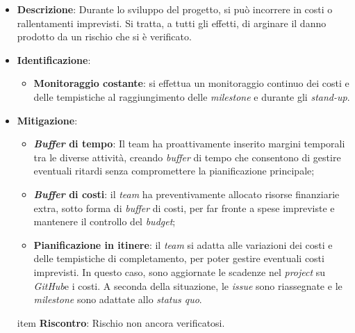 \label{risk:costi e tempi imprevisti}
\begin{itemize}
	\item \textbf{Descrizione}:
	      Durante lo sviluppo del progetto, si può incorrere in costi o
	      rallentamenti imprevisti. Si tratta, a tutti gli effetti, di arginare
	      il danno prodotto da un rischio che si è verificato.
	\item \textbf{Identificazione}:
	      \begin{itemize}
		      \item \textbf{Monitoraggio costante}: si effettua un monitoraggio 
			  		continuo dei costi e delle tempistiche al raggiungimento delle 
					\textit{milestone} e durante gli \textit{stand-up}.
			  
	      \end{itemize}
	\item \textbf{Mitigazione}:
	      \begin{itemize}
		      \item \textbf{\textit{Buffer} di tempo}: Il team ha proattivamente 
			  		inserito margini temporali tra le diverse attività, creando 
					\textit{buffer} di tempo che consentono di gestire eventuali 
					ritardi senza compromettere la pianificazione principale;

		      \item \textbf{\textit{Buffer} di costi}: il \textit{team} ha 
			  		preventivamente allocato risorse finanziarie extra, 
					sotto forma di \textit{buffer} di costi, per far fronte 
					a spese impreviste e mantenere il controllo del \textit{budget};

		      \item \textbf{Pianificazione in itinere}: il \textit{team} si adatta
		            alle variazioni dei costi e delle tempistiche di
		            completamento, per poter gestire eventuali costi
		            imprevisti. In questo caso, sono aggiornate le scadenze
		            nel \textit{project} su \textit{GitHub}\g e i costi.
		            A seconda della situazione, le \textit{issue} sono
		            riassegnate e le \textit{milestone} sono adattate allo
		            \textit{status quo}.
	      \end{itemize}
	item \textbf{Riscontro}: Rischio non ancora verificatosi.
\end{itemize}
